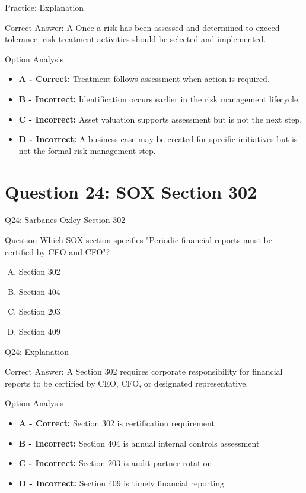 \documentclass{beamer}
\begin{document}
	\begin{frame}{Practice: Explanation}
		\begin{block}{Correct Answer: A}
			Once a risk has been assessed and determined to exceed tolerance, risk treatment activities should be selected and implemented.
		\end{block}
		\begin{block}{Option Analysis}
			\begin{itemize}
				\item \textbf{A - Correct:} Treatment follows assessment when action is required.
				\item \textbf{B - Incorrect:} Identification occurs earlier in the risk management lifecycle.
				\item \textbf{C - Incorrect:} Asset valuation supports assessment but is not the next step.
				\item \textbf{D - Incorrect:} A business case may be created for specific initiatives but is not the formal risk management step.
			\end{itemize}
		\end{block}
	\end{frame}
	
	\section{Question 24: SOX Section 302}
	
	\begin{frame}{Q24: Sarbanes-Oxley Section 302}
		\begin{block}{Question}
			Which SOX section specifies "Periodic financial reports must be certified by CEO and CFO"?
		\end{block}
		\begin{enumerate}[(A)]
			\item Section 302
			\item Section 404
			\item Section 203
			\item Section 409
		\end{enumerate}
	\end{frame}
	
	\begin{frame}{Q24: Explanation}
		\begin{block}{Correct Answer: A}
			Section 302 requires corporate responsibility for financial reports to be certified by CEO, CFO, or designated representative.
		\end{block}
		\begin{block}{Option Analysis}
			\begin{itemize}
				\item \textbf{A - Correct:} Section 302 is certification requirement
				\item \textbf{B - Incorrect:} Section 404 is annual internal controls assessment
				\item \textbf{C - Incorrect:} Section 203 is audit partner rotation
				\item \textbf{D - Incorrect:} Section 409 is timely financial reporting
			\end{itemize}
		\end{block}
	\end{frame}
	
\end{document}
